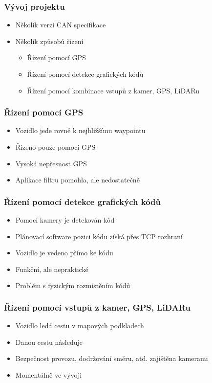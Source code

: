 \documentclass{beamer}
\begin{document}
\begin{frame}
    \frametitle{Vývoj projektu}
    \begin{itemize}
        \item Několik verzí CAN specifikace
        \item Několik způsobů řízení
            \begin{itemize}
                \item Řízení pomocí GPS
                \item Řízení pomocí detekce grafických kódů
                \item Řízení pomocí kombinace vstupů z kamer, GPS, LiDARu
            \end{itemize}
    \end{itemize}
\end{frame}

\begin{frame}
    \frametitle{Řízení pomocí GPS}
    \begin{itemize}
        \item Vozidlo jede rovně k nejbližšímu waypointu
        \item Řízeno pouze pomocí GPS
        \item Vysoká nepřesnost GPS
        \item Aplikace filtru pomohla, ale nedostatečně
    \end{itemize}
\end{frame}

\begin{frame}
    \frametitle{Řízení pomocí detekce grafických kódů}
    \begin{itemize}
        \item Pomocí kamery je detekován kód
        \item Plánovací software pozici kódu získá přes TCP rozhraní
        \item Vozidlo je vedeno přímo ke kódu
        \item Funkční, ale nepraktické
        \item Problém s fyzickým rozmístěním kódů
    \end{itemize}
\end{frame}

\begin{frame}
    \frametitle{Řízení pomocí vstupů z kamer, GPS, LiDARu}
    \begin{itemize}
        \item Vozidlo ledá cestu v mapových podkladech
        \item Danou cestu následuje
        \item Bezpečnost provozu, dodržování směru, atd. zajištěna kamerami
        \item Momentálně ve vývoji
    \end{itemize}
\end{frame}
\end{document}
